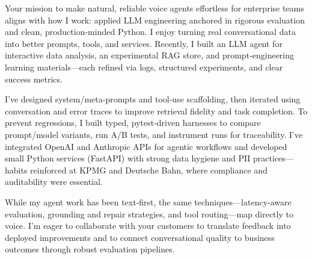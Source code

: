 Your mission to make natural, reliable voice agents effortless for enterprise teams aligns with how I work: applied LLM engineering anchored in rigorous evaluation and clean, production-minded Python. I enjoy turning real conversational data into better prompts, tools, and services. Recently, I built an LLM agent for interactive data analysis, an experimental RAG store, and prompt‑engineering learning materials—each refined via logs, structured experiments, and clear success metrics.

I’ve designed system/meta‑prompts and tool‑use scaffolding, then iterated using conversation and error traces to improve retrieval fidelity and task completion. To prevent regressions, I built typed, pytest‑driven harnesses to compare prompt/model variants, run A/B tests, and instrument runs for traceability. I’ve integrated OpenAI and Anthropic APIs for agentic workflows and developed small Python services (FastAPI) with strong data hygiene and PII practices—habits reinforced at KPMG and Deutsche Bahn, where compliance and auditability were essential.

While my agent work has been text‑first, the same techniques—latency‑aware evaluation, grounding and repair strategies, and tool routing—map directly to voice. I’m eager to collaborate with your customers to translate feedback into deployed improvements and to connect conversational quality to business outcomes through robust evaluation pipelines.